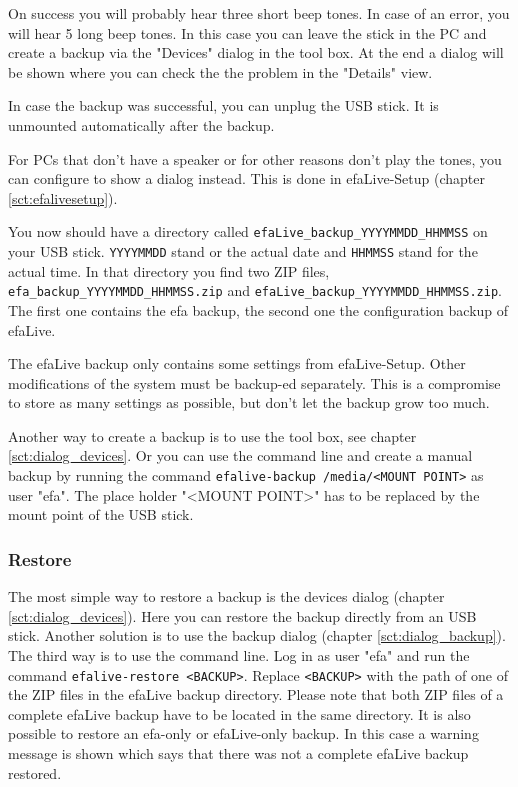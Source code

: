 \documentclass[a4paper,12pt,twoside]{article}
\begin{document}
On success you will probably hear three short beep tones. In case of an
error, you will hear 5 long beep tones. In this case you can leave the
stick in the PC and create a backup via the "Devices" dialog in the tool 
box. At the end a dialog will be shown where you can check the the problem
in the "Details" view.

In case the backup was successful, you can unplug the USB stick. It is
unmounted automatically after the backup.

For PCs that don't have a speaker or for other reasons
don't play the tones, you can configure to show a
dialog instead. This is done in efaLive-Setup (chapter \ref{sct:efalivesetup}).

You now should have a directory called
\texttt{efaLive\_backup\_YYYYMMDD\_HHMMSS} on your
USB stick. \texttt{YYYYMMDD} stand or the actual
date and \texttt{HHMMSS} stand for the actual
time. In that directory you find two ZIP files,
\texttt{efa\_backup\_YYYYMMDD\_HHMMSS.zip} and
\texttt{efaLive\_backup\_YYYYMMDD\_HHMMSS.zip}.
The first one contains the efa backup, the second one the configuration
backup of efaLive.

The efaLive backup only contains some settings from efaLive-Setup. Other
modifications of the system must be backup-ed separately. This is a
compromise to store as many settings as possible, but
don't let the backup grow too much.

Another way to create a backup is to use the tool box, see chapter 
\ref{sct:dialog_devices}. Or you can use the command line and create a manual 
backup by running the command \texttt{efalive-backup 
/media/{\textless}MOUNT POINT{\textgreater}} as user "efa". The place 
holder "{\textless}MOUNT POINT{\textgreater}" has to be replaced by the 
mount point of the USB stick.


\subsubsection{Restore}
\label{sct:restore}
The most simple way to restore a backup is the devices dialog (chapter
\ref{sct:dialog_devices}). Here you can restore the backup directly from an USB stick.
Another solution is to use the backup dialog (chapter \ref{sct:dialog_backup}). The third
way is to use the command line. Log in as user
"efa" and run the command
\texttt{efalive-restore {\textless}BACKUP{\textgreater}}. Replace
\texttt{{\textless}BACKUP{\textgreater}} with the
path of one of the ZIP files in the efaLive backup directory. Please
note that both ZIP files of a complete efaLive backup have to be located in the
same directory. It is also possible to restore an efa-only or efaLive-only backup.
In this case a warning message is shown which says that there was not a complete
efaLive backup restored.
\end{document}
